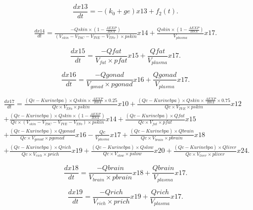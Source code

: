 \documentclass[a4paper,punct=banjiao,twoside]{ctexrep}
\theoremstyle{plain}
\theoremstyle{definition}
\theoremstyle{remark}
\begin{document}
\begin{equation}\label{eq13}
  \frac{dx13}{dt}=-(k_0+ge)x13+f_2 (t).
\end{equation}

\begin{multline}\label{eq14}
  \frac{dx14}{dt}=\frac{-Qskin \times  (1-\frac{AEXP}{BSA})}{(V_{skin}-V_{TSC}-V_{TVE}-V_{TFo}) \times  pskin} x14+\frac{Qskin \times  (1-\frac{AEXP}{BSA})}{V_{plasma}}  x17.
\end{multline}

\begin{equation}\label{eq15}
  \frac{dx15}{dt}=\frac{-Qfat}{V_{fat}  \times  pfat} x15+\frac{Qfat}{V_{plasma}}  x17.
\end{equation}

\begin{equation}\label{eq16}
  \frac{dx16}{dt}=\frac{-Qgonad}{V_{gonad}  \times  pgonad} x16+\frac{Qgonad}{V_{plasma}}  x17.
\end{equation}

\begin{multline}\label{eq17}
  \frac{dx17}{dt}=\frac{(Qc-Kurinebpa) \times  Qskin \times  \frac{AEXP}{BSA} \times  0.25}{Qc \times  V_{TFo}  \times  pskin} x10+\frac{(Qc-Kurinebpa) \times  Qskin \times  \frac{AEXP}{BSA} \times  0.75}{Qc \times  V_{TVE}  \times  pskin} x12\\
  +\frac{(Qc-Kurinebpa) \times  Qskin \times  (1-\frac{AEXP}{BSA})}{Qc \times  (V_{skin}-V_{TSC}-V_{TVE}-V_{TFo}) \times  pskin} x14+\frac{(Qc-Kurinebpa) \times  Qfat}{Qc \times  V_{fat}  \times  pfat} x15\\
  +\frac{(Qc-Kurinebpa) \times  Qgonad}{Qc \times  V_{gonad}  \times  pgonad} x16-\frac{Qc}{V_{plasma}}  x17+\frac{(Qc-Kurinebpa) \times  Qbrain}{Qc \times  V_{brain} \times  pbrain} x18\\
  +\frac{(Qc-Kurinebpa) \times  Qrich}{Qc \times  V_{rich}  \times  prich} x19+\frac{(Qc-Kurinebpa) \times  Qslow}{Qc \times  V_{slow}  \times  pslow} x20
  +\frac{(Qc-Kurinebpa) \times  Qliver}{Qc \times  V_{liver} \times  pliver} x24.
\end{multline}

\begin{equation}\label{eq18}
  \frac{dx18}{dt}=\frac{-Qbrain}{V_{brain}  \times  pbrain} x18+\frac{Qbrain}{V_{plasma}}  x17.
\end{equation}

\begin{equation}\label{eq19}
  \frac{dx19}{dt}=\frac{-Qrich}{V_{rich}  \times  prich} x19+\frac{Qrich}{V_{plasma}}  x17.
\end{equation}
\end{document}
